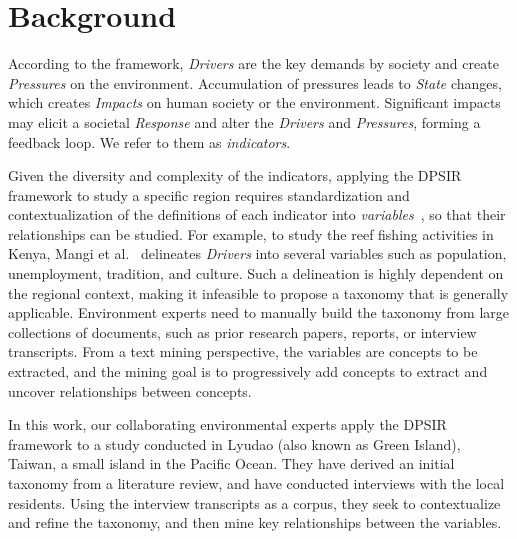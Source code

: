 \vspace*{-0.15cm}
\section{Background}
According to the framework, \textit{Drivers} are the key demands by society and create \textit{Pressures} on the environment.
 Accumulation of pressures leads to \textit{State} changes, which creates \textit{Impacts} on human society or the environment. Significant impacts may elicit a societal \textit{Response} and alter the \textit{Drivers} and \textit{Pressures}, forming a feedback loop. 
We refer to them as \textit{indicators}. 

Given the diversity and complexity of the indicators, applying the DPSIR framework to study a specific region requires standardization and contextualization of the definitions of each indicator into \textit{variables}~\cite{oesterwind2016dpsiruntangle}, so that their relationships can be studied. 
For example, to study the reef fishing activities in Kenya, Mangi et al.~\cite{mangi2007reefdpsir} delineates \textit{Drivers} into several variables such as population, unemployment, tradition, and culture. Such a delineation is highly dependent on the regional context, making it infeasible to propose a taxonomy that is generally applicable. Environment experts need to manually build the taxonomy from large collections of documents, such as prior research papers, reports, or interview transcripts.
From a text mining perspective, the variables are concepts to be extracted, and the mining goal is to progressively add concepts to extract and uncover relationships between concepts.

In this work, our collaborating environmental experts apply the DPSIR framework to a study conducted in Lyudao (also known as Green Island), Taiwan, a small island in the Pacific Ocean. They have derived an initial taxonomy from a literature review, and have conducted interviews with the local residents. Using the interview transcripts as a corpus, they seek to contextualize and refine the taxonomy, and then mine key relationships between the variables. 

